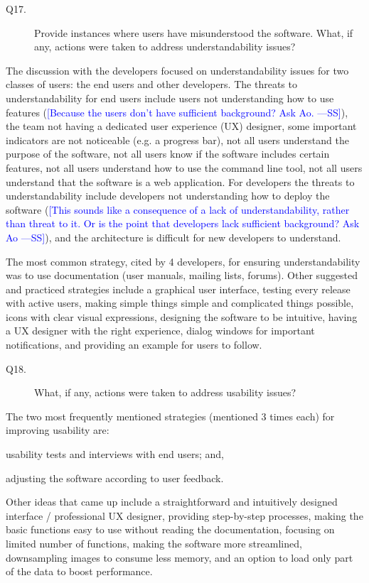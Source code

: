 \documentclass[final, 3p, times, authoryear]{elsarticle}
\newcommand{\authornote}[3]{\textcolor{#1}{[#3 ---#2]}}
\newcommand{\authornote}[3]{}
\newcommand{\wss}[1]{\authornote{blue}{SS}{#1}} %
\begin{document}
\begin{description}
\item[Q17.] Provide instances where users have misunderstood the software. What,
if any, actions were taken to address understandability issues?
\end{description}

The discussion with the developers focused on understandability issues for two
classes of users: the end users and other developers.  The threats to
understandability for end users include users not understanding how to use
features (\wss{Because the users don't have sufficient background?  Ask Ao.}),
the team not having a dedicated user experience (UX) designer, some important
indicators are not noticeable (e.g. a progress bar), not all users understand
the purpose of the software, not all users know if the software includes certain
features, not all users understand how to use the command line tool, not all
users understand that the software is a web application. For developers the
threats to understandability include developers not understanding how to deploy
the software (\wss{This sounds like a consequence of a lack of
understandability, rather than threat to it.  Or is the point that developers
lack sufficient background?  Ask Ao}), and the architecture is difficult for new
developers to understand.

The most common strategy, cited by 4 developers, for ensuring understandability
was to use documentation (user manuals, mailing lists, forums).  Other suggested
and practiced strategies include a graphical user interface, testing every
release with active users, making simple things simple and complicated things
possible, icons with clear visual expressions, designing the software to be
intuitive, having a UX designer with the right experience, dialog windows for
important notifications, and providing an example for users to follow.

\begin{description}
\item[Q18.] What, if any, actions were taken to address usability issues?
\end{description}

The two most frequently mentioned strategies (mentioned 3 times each) for
improving usability are:
\begin{inparaenum}[i)]
    \item usability tests and interviews with end users; and,
    \item adjusting the software according to user feedback.
\end{inparaenum}
Other ideas that came up include a straightforward and intuitively designed
interface / professional UX designer, providing step-by-step processes, making
the basic functions easy to use without reading the documentation, focusing on
limited number of functions, making the software more streamlined, downsampling
images to consume less memory, and an option to load only part of the data to
boost performance.
\end{document}
